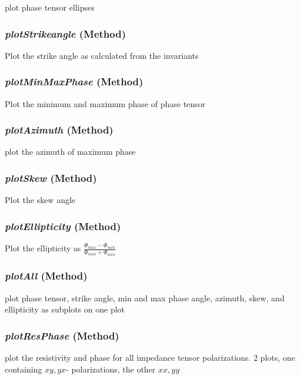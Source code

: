 plot phase tensor ellipses

\subsubsection{\textit{plotStrikeangle} (Method)}
\label{sssec:imaging.ptplots.ptplots.plotStrikeangle}

Plot the strike angle as calculated from the invariants

\subsubsection{\textit{plotMinMaxPhase} (Method)}
\label{sssec:imaging.ptplots.ptplots.plotMinMaxPhase}

Plot the minimum and maximum phase of phase tensor

\subsubsection{\textit{plotAzimuth} (Method)}
\label{sssec:imaging.ptplots.ptplots.plotAzimuth}

plot the azimuth of maximum phase

\subsubsection{\textit{plotSkew} (Method)}
\label{sssec:imaging.ptplots.ptplots.plotSkew}

Plot the skew angle

\subsubsection{\textit{plotEllipticity} (Method)}
\label{sssec:imaging.ptplots.ptplots.plotEllipticity}

Plot the ellipticity as $\frac{\Phi_{max} - \Phi_{min} }{\Phi_{max} + \Phi_{min}}$

\subsubsection{\textit{plotAll} (Method)}
\label{sssec:imaging.ptplots.ptplots.plotAll}

 plot phase tensor, strike angle, min and max phase angle, 
        azimuth, skew, and ellipticity as subplots on one plot

\subsubsection{\textit{plotResPhase} (Method)}
\label{sssec:imaging.ptplots.ptplots.plotResPhase}

plot the resistivity and phase for
        all impedance tensor polarizations.  2 plots, one containing $xy,yx$- 
        polarizations, the other $xx,yy$

